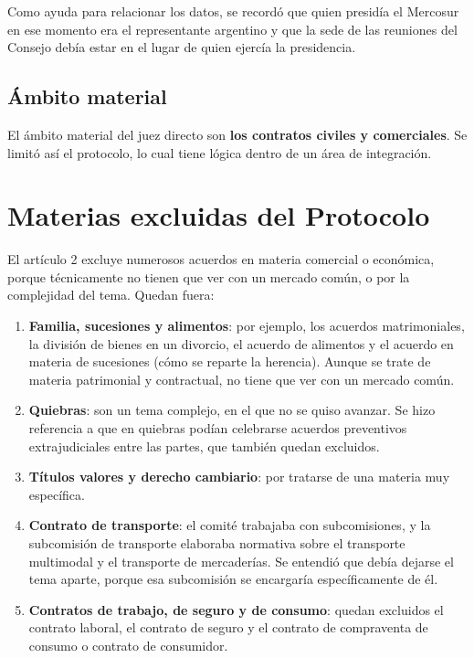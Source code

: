 \documentclass[12pt,oneside]{book}
\begin{document}

Como ayuda para relacionar los datos, se recordó que quien presidía el Mercosur en ese momento era el representante argentino y que la sede de las reuniones del Consejo debía estar en el lugar de quien ejercía la presidencia.


\subsection{Ámbito material}

El ámbito material del juez directo son \textbf{los contratos civiles y comerciales}. Se limitó así el protocolo, lo cual tiene lógica dentro de un área de integración.

\section{Materias excluidas del Protocolo}

El artículo 2 excluye numerosos acuerdos en materia comercial o económica, porque técnicamente no tienen que ver con un mercado común, o por la complejidad del tema. Quedan fuera:

\begin{enumerate}
    \item \textbf{Familia, sucesiones y alimentos}: por ejemplo, los acuerdos matrimoniales, la división de bienes en un divorcio, el acuerdo de alimentos y el acuerdo en materia de sucesiones (cómo se reparte la herencia). Aunque se trate de materia patrimonial y contractual, no tiene que ver con un mercado común.
    \item \textbf{Quiebras}: son un tema complejo, en el que no se quiso avanzar. Se hizo referencia a que en quiebras podían celebrarse acuerdos preventivos extrajudiciales entre las partes, que también quedan excluidos.
    \item \textbf{Títulos valores y derecho cambiario}: por tratarse de una materia muy específica.
    \item \textbf{Contrato de transporte}: el comité trabajaba con subcomisiones, y la subcomisión de transporte elaboraba normativa sobre el transporte multimodal y el transporte de mercaderías. Se entendió que debía dejarse el tema aparte, porque esa subcomisión se encargaría específicamente de él.
    \item \textbf{Contratos de trabajo, de seguro y de consumo}: quedan excluidos el contrato laboral, el contrato de seguro y el contrato de compraventa de consumo o contrato de consumidor.
\end{enumerate}
\end{document}

